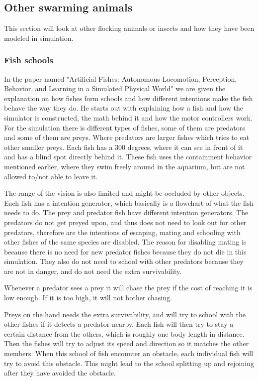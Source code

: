 \subsection{Other swarming animals}
This section will look at other flocking animals or insects and how they have been modeled in simulation.
\subsubsection{Fish schools}
In the paper named "Artificial Fishes: Autonomous Locomotion, Perception, Behavior, and Learning in a Simulated Physical World" \citep{Demetri1994} we are given the explanation on how fishes form schools and how different intentions make the fish behave the way they do. He starts out with explaining how a fish and how the simulator is constructed, the math behind it and how the motor controllers work. For the simulation there is different types of fishes, some of them are predators and some of them are preys. Where predators are larger fishes which tries to eat other smaller preys. Each fish has a 300 degrees, where it can see in front of it and has a blind spot directly behind it. These fish uses the containment behavior mentioned earlier, where they swim freely around in the aquarium, but are not allowed to/not able to leave it.

The range of the vision is also limited and might be occluded by other objects. Each fish has a intention generator, which basically is a flowchart of what the fish needs to do. The prey and predator fish have different intention generators. The predators do not get preyed upon, and thus does not need to look out for other predators, therefore are the intentions of escaping, mating and schooling with other fishes of the same species are disabled. The reason for disabling mating is because there is no need for new predator fishes because they do not die in this simulation. They also do not need to school with other predators because they are not in danger, and do not need the extra survivability.

Whenever a predator sees a prey it will chase the prey if the cost of reaching it is low enough. If it is too high, it will not bother chasing.

Preys on the hand needs the extra survivability, and will try to school with the other fishes if it detects a predator nearby. Each fish will then try to stay a certain distance from the others, which is roughly one body length in distance. Then the fishes will try to adjust its speed and direction so it matches the other members. When this school of fish encounter an obstacle, each individual fish will try to avoid this obstacle. This might lead to the school splitting up and rejoining after they have avoided the obstacle.

